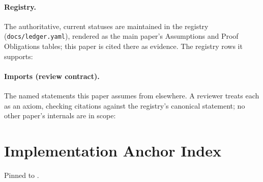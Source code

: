 \documentclass[11pt]{article}
\begin{document}
\paragraph{Registry.}
The authoritative, current statuses are maintained in the registry
(\texttt{docs/ledger.yaml}), rendered as the main paper's Assumptions and
Proof Obligations tables; this paper is cited there as evidence. The
registry rows it supports:



\paragraph{Imports (review contract).}
The named statements this paper assumes from elsewhere. A reviewer treats
each as an axiom, checking citations against the registry's canonical
statement; no other paper's internals are in scope:



\section{Implementation Anchor Index}
\label{sec:anchors}

Pinned to \texttt{\skjspinhash}.
\end{document}
